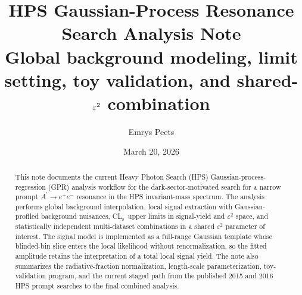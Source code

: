 \documentclass[11pt]{article}
\title{\vspace{-1.0em}HPS Gaussian-Process Resonance Search Analysis Note\\
\large Global background modeling, limit setting, toy validation, and shared-$\eps^2$ combination}
\author{Emrys Peets}
\date{March 20, 2026}
\newcommand{\eps}{\varepsilon}
\newcommand{\CLs}{CL$_\mathrm{s}$}
\begin{document}
\maketitle

\begin{abstract}
This note documents the current Heavy Photon Search (HPS) Gaussian-process-regression
(GPR) analysis workflow for the dark-sector-motivated search for a narrow prompt
$A^\prime \rightarrow e^+e^-$ resonance in the HPS invariant-mass spectrum. The
analysis performs global background interpolation, local signal extraction with
Gaussian-profiled background nuisances, \CLs\ upper limits in signal-yield and
$\eps^2$ space, and statistically independent multi-dataset combinations in a shared
$\eps^2$ parameter of interest. The signal model is implemented as a full-range
Gaussian template whose blinded-bin slice enters the local likelihood without
renormalization, so the fitted amplitude retains the interpretation of a total local
signal yield. The note also summarizes the radiative-fraction normalization,
length-scale parameterization, toy-validation program, and the current staged path from
the published 2015 and 2016 HPS prompt searches to the final combined analysis.
\end{abstract}

\tableofcontents
\clearpage








\appendix


\clearpage


\end{document}
